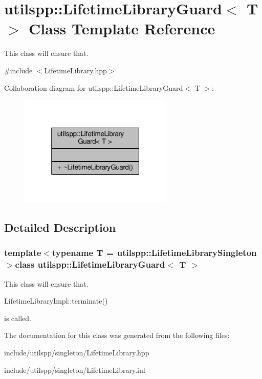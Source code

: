 \hypertarget{classutilspp_1_1LifetimeLibraryGuard}{\section{utilspp\-:\-:Lifetime\-Library\-Guard$<$ T $>$ Class Template Reference}
\label{classutilspp_1_1LifetimeLibraryGuard}
}


This class will ensure that.  




{\ttfamily \#include $<$Lifetime\-Library.\-hpp$>$}



Collaboration diagram for utilspp\-:\-:Lifetime\-Library\-Guard$<$ T $>$\-:
\nopagebreak
\begin{figure}[H]
\begin{center}
\leavevmode
\includegraphics[width=208pt]{classutilspp_1_1LifetimeLibraryGuard__coll__graph}
\end{center}
\end{figure}


\subsection{Detailed Description}
\subsubsection*{template$<$typename T = utilspp\-::\-Lifetime\-Library\-Singleton$>$class utilspp\-::\-Lifetime\-Library\-Guard$<$ T $>$}

This class will ensure that. 

Lifetime\-Library\-Impl\-::terminate()

is called. 

The documentation for this class was generated from the following files\-:\begin{DoxyCompactItemize}
\item 
include/utilspp/singleton/Lifetime\-Library.\-hpp\item 
include/utilspp/singleton/Lifetime\-Library.\-inl\end{DoxyCompactItemize}
